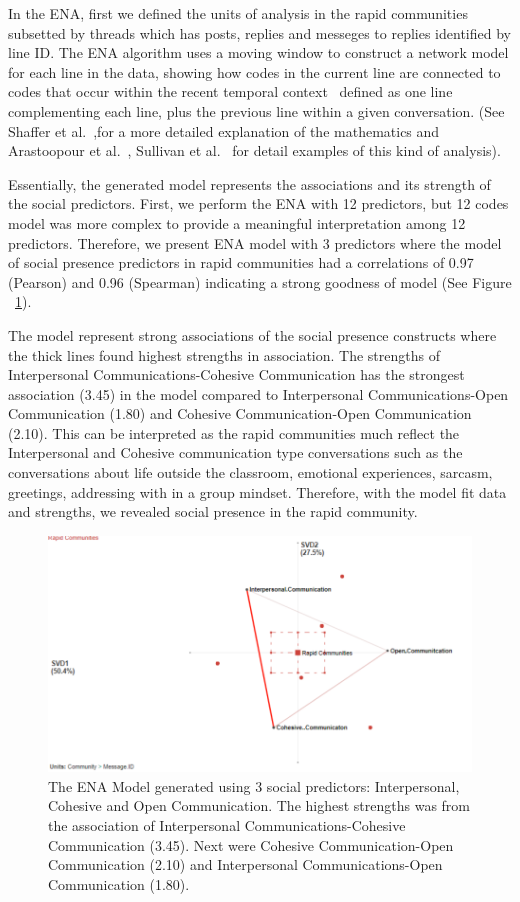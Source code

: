 \documentclass[manuscript,screen,review]{acmart}
\begin{document}
In the ENA, first we defined the units of analysis in the rapid communities subsetted by threads which has posts, replies and messeges to replies identified by line ID. The ENA algorithm uses a moving window to construct a network model for each line in the data, showing how codes in the current line are connected to codes that occur within the recent temporal context~\cite{siebert2017search} defined as one line complementing each line, plus the previous line within a given conversation. (See  Shaffer et al.~\cite{shaffer2016tutorial},for a more detailed explanation of the mathematics and Arastoopour et al.~\cite{arastoopour2015epistemic}, Sullivan et al.~\cite{sullivan2018using} for detail examples of this kind of analysis). 

Essentially, the generated model represents the associations and its strength of the social predictors. First, we perform the ENA with 12 predictors, but 12 codes model was more complex to provide a meaningful interpretation among 12 predictors. Therefore, we present ENA model with 3 predictors where the model of social presence predictors in rapid communities had a correlations of 0.97 (Pearson) and 0.96 (Spearman) indicating a strong goodness of model (See Figure ~\ref{fig:primary}).

The model represent strong associations of the social presence constructs where the thick lines found highest strengths in association. The strengths of Interpersonal Communications-Cohesive Communication has the strongest association (3.45) in the model compared to Interpersonal Communications-Open Communication (1.80) and Cohesive Communication-Open Communication (2.10). This can be interpreted as the rapid communities much reflect the Interpersonal and Cohesive communication type conversations such as the conversations about life outside the classroom, emotional experiences, sarcasm, greetings, addressing with in a group mindset. Therefore, with the model fit data and strengths, we revealed social presence in the rapid community. 
\begin{figure}[h]
  \centering
  \includegraphics[width=0.7\linewidth]{images/ENASocialP.png}
  \caption{The ENA Model generated using 3 social predictors: Interpersonal, Cohesive and Open Communication. The highest  strengths was from the association of Interpersonal Communications-Cohesive Communication (3.45). Next were Cohesive Communication-Open Communication (2.10) and Interpersonal Communications-Open Communication (1.80). }
 \label{fig:primary}
\end{figure}
\end{document}
